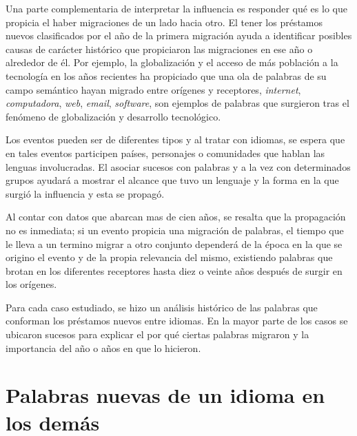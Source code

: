 Una parte complementaria de interpretar la influencia es responder qué es lo que propicia el haber migraciones de un lado hacia otro.  El tener los préstamos nuevos clasificados por el año de la primera migración ayuda a identificar posibles causas de carácter histórico que propiciaron las migraciones en ese año o alrededor de él.  Por ejemplo, la globalización y el acceso de más población a la tecnología en los años recientes ha propiciado que una ola de palabras de su campo semántico hayan migrado entre orígenes y receptores,  \textit{internet}, \textit{computadora}, \textit{web}, \textit{email},  \textit{software}, son ejemplos de palabras que surgieron tras el fenómeno de globalización y desarrollo tecnológico. 



Los eventos pueden ser de diferentes tipos y al tratar con idiomas, se espera que en tales eventos participen países, personajes o  comunidades que hablan las lenguas involucradas.  El asociar sucesos con palabras y a la vez con determinados grupos ayudará a mostrar el alcance que tuvo un lenguaje y la forma en la que surgió la influencia y esta se propagó.

Al contar con datos que abarcan mas de cien años, se resalta que la propagación no es inmediata; si un evento propicia una migración de palabras, el tiempo que le lleva a un termino migrar a otro conjunto dependerá de la época en la que se origino el evento y de la propia relevancia del mismo, existiendo palabras que brotan en los diferentes receptores hasta diez o veinte años después de surgir en los orígenes.

Para cada caso estudiado, se hizo un análisis histórico de las palabras que
conforman los préstamos nuevos entre idiomas.  En la mayor parte de los casos
se ubicaron sucesos para explicar el por qué ciertas palabras migraron y la
importancia del año o años en que lo hicieron. 


\section{Palabras nuevas de un idioma en los demás}


